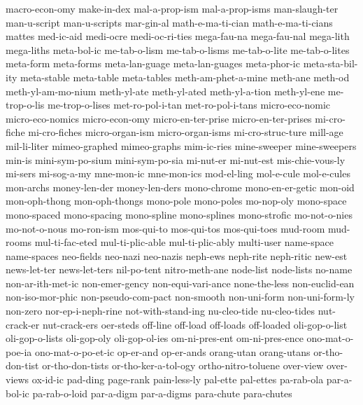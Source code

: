 {{{  macro-econ-omy
  make-in-dex
  mal-a-prop-ism
  mal-a-prop-isms
  man-slaugh-ter
  man-u-script
  man-u-scripts
  mar-gin-al
  math-e-ma-ti-cian
  math-e-ma-ti-cians
  mattes
  med-ic-aid
  medi-ocre
  medi-oc-ri-ties
  mega-fau-na
  mega-fau-nal
  mega-lith
  mega-liths
  meta-bol-ic
  me-tab-o-lism
  me-tab-o-lisms
  me-tab-o-lite
  me-tab-o-lites
  meta-form
  meta-forms
  meta-lan-guage
  meta-lan-guages
  meta-phor-ic
  meta-sta-bil-ity
  meta-stable
  meta-table
  meta-tables
  meth-am-phet-a-mine
  meth-ane
  meth-od
  meth-yl-am-mo-nium
  meth-yl-ate
  meth-yl-ated
  meth-yl-a-tion
  meth-yl-ene
  me-trop-o-lis
  me-trop-o-lises
  met-ro-pol-i-tan
  met-ro-pol-i-tans
  micro-eco-nomic
  micro-eco-nomics
  micro-econ-omy
  micro-en-ter-prise
  micro-en-ter-prises
  mi-cro-fiche
  mi-cro-fiches
  micro-organ-ism
  micro-organ-isms
  mi-cro-struc-ture
  mill-age
  mil-li-liter
  mimeo-graphed
  mimeo-graphs
  mim-ic-ries
  mine-sweeper
  mine-sweepers
  min-is
  mini-sym-po-sium
  mini-sym-po-sia
  mi-nut-er
  mi-nut-est
  mis-chie-vous-ly
  mi-sers
  mi-sog-a-my
  mne-mon-ic
  mne-mon-ics
  mod-el-ling
  mol-e-cule
  mol-e-cules
  mon-archs
  money-len-der
  money-len-ders
  mono-chrome
  mono-en-er-getic
  mon-oid
  mon-oph-thong
  mon-oph-thongs
  mono-pole
  mono-poles
  mo-nop-oly
  mono-space
  mono-spaced
  mono-spacing
  mono-spline
  mono-splines
  mono-strofic
  mo-not-o-nies
  mo-not-o-nous
  mo-ron-ism
  mos-qui-to
  mos-qui-tos
  mos-qui-toes
  mud-room
  mud-rooms
  mul-ti-fac-eted
  mul-ti-plic-able
  mul-ti-plic-ably
  multi-user
  name-space
  name-spaces
  neo-fields
  neo-nazi
  neo-nazis
  neph-ews
  neph-rite
  neph-ritic
  new-est
  news-let-ter
  news-let-ters
  nil-po-tent
  nitro-meth-ane
  node-list
  node-lists
  no-name
  non-ar-ith-met-ic
  non-emer-gency
  non-equi-vari-ance
  none-the-less
  non-euclid-ean
  non-iso-mor-phic
  non-pseudo-com-pact
  non-smooth
  non-uni-form
  non-uni-form-ly
  non-zero
  nor-ep-i-neph-rine
  not-with-stand-ing
  nu-cleo-tide
  nu-cleo-tides
  nut-crack-er
  nut-crack-ers
  oer-steds
  off-line
  off-load
  off-loads
  off-loaded
  oli-gop-o-list
  oli-gop-o-lists
  oli-gop-oly
  oli-gop-ol-ies
  om-ni-pres-ent
  om-ni-pres-ence
  ono-mat-o-poe-ia
  ono-mat-o-po-et-ic
  op-er-and
  op-er-ands
  orang-utan
  orang-utans
  or-tho-don-tist
  or-tho-don-tists
  or-tho-ker-a-tol-ogy
  ortho-nitro-toluene
  over-view
  over-views
  ox-id-ic
  pad-ding
  page-rank
  pain-less-ly
  pal-ette
  pal-ettes
  pa-rab-ola
  par-a-bol-ic
  pa-rab-o-loid
  par-a-digm
  par-a-digms
  para-chute
  para-chutes
}}}
